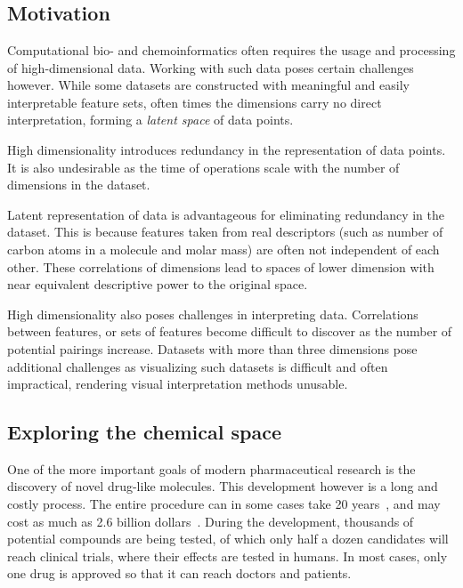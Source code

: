 \chapter{\bevezetes}\label{ch:introduction}

\section{Motivation}\label{sec:motivation}

Computational bio- and chemoinformatics often requires the usage and processing of high-dimensional data. Working with such data poses certain challenges however. While some datasets are constructed with meaningful and easily interpretable feature sets, often times the dimensions carry no direct interpretation, forming a \textit{latent space} of data points.

High dimensionality introduces redundancy in the representation of data points. It is also undesirable as the time of operations scale with the number of dimensions in the dataset.

Latent representation of data is advantageous for eliminating redundancy in the dataset. This is because features taken from real descriptors (such as number of carbon atoms in a molecule and molar mass) are often not independent of each other. These correlations of dimensions lead to spaces of lower dimension with near equivalent descriptive power to the original space.

High dimensionality also poses challenges in interpreting data. Correlations between features, or sets of features become difficult to discover as the number of potential pairings increase. Datasets with more than three dimensions pose additional challenges as visualizing such datasets is difficult and often impractical, rendering visual interpretation methods unusable.

\section{Exploring the chemical space}\label{sec:exploring-the-chemical-space}

One of the more important goals of modern pharmaceutical research is the discovery of novel drug-like molecules. This development however is a long and costly process. The entire procedure can in some cases take 20 years~\cite{bib:rndprod}, and may cost as much as 2.6 billion dollars~\cite{bib:2.6billion}. During the development, thousands of potential compounds are being tested, of which only half a dozen candidates will reach clinical trials, where their effects are tested in humans. In most cases, only one drug is approved so that it can reach doctors and patients.

